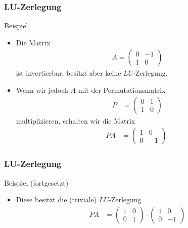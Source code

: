 \documentclass{beamer}
\newcommand{\mytitle}{LU-Zerlegung}
\begin{document}
\begin{frame}\frametitle{\mytitle}
	\begin{block}{Beispiel}
		\begin{itemize}
			\item Die Matrix
				\begin{align*}
					A=\begin{pmatrix}0&-1\\1&0\end{pmatrix}
				\end{align*}
				ist invertierbar, besitzt aber keine $LU$-Zerlegung.
			\item Wenn wir jedoch $A$ mit der Permutationsmatrix
				\begin{align*}
					P&=\begin{pmatrix}
						0&1\\1&0
					\end{pmatrix}
				\end{align*}
				multiplizieren, erhalten wir die Matrix
				\begin{align*}
					PA&=\begin{pmatrix}
						1&0\\0&-1
					\end{pmatrix}.
				\end{align*}
		\end{itemize}
	\end{block}
\end{frame}

\begin{frame}\frametitle{\mytitle}
	\begin{block}{Beispiel (fortgesetzt)}
		\begin{itemize}
			\item Diese besitzt die (triviale) $LU$-Zerlegung
					\begin{align*}
						PA&=\begin{pmatrix} 1&0\\0&1 \end{pmatrix}\cdot\begin{pmatrix} 1&0\\0&-1\end{pmatrix}
					\end{align*}
		\end{itemize}
	\end{block}
\end{frame}
\end{document}

